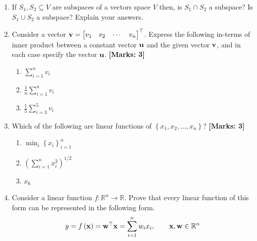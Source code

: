 \begin{enumerate}

    \item If $S_1, S_2 \subseteq V$ are subspaces of a vectors space $V$ then, is $S_1 \cap S_2$ a subspace? Is $S_1 \cup S_2$ a subspace? Explain your answers.
    
    \item Consider a vector $\mf{v} = \begin{bmatrix*}v_1 & v_2 & \cdots & v_n\end{bmatrix*}^\top$. Express the following in-terms of inner product between a constant vector $\mathbf{u}$ and the given vector $\mathbf{v}$, and in each case specify the vector $\mathbf{u}$. \textbf{[Marks: 3]}
    \begin{enumerate}
        \item $\sum_{i=1}^n v_i$
        \item $\frac{1}{n}\sum_{i=1}^n v_i$
        \item $\frac{1}{5}\sum_{i=3}^5 v_i$
    \end{enumerate} 
    
    \item Which of the following are linear functions of $\left\{x_1, x_2, \ldots,x_n\right\}$? \textbf{[Marks: 3]}
    \begin{enumerate}
        \item $\min_i \left\{x_i\right\}_{i=1}^{n}$
        \item $\left(\sum_{i=1}^n x_i^2\right)^{1/2}$
        \item $x_6$
    \end{enumerate}

    \item Consider a linear function $f: \mathbb{R}^n \rightarrow \mathbb{R}$. Prove that every linear function of this form can be represented in the following form.
    \[ y = f\left(\mathbf{x}\right) = \mathbf{w}^\top\mathbf{x} = \sum_{i=1}^{n}w_ix_i, \quad \quad \mathbf{x}, \mathbf{w} \in \mathbb{R}^n \]


\end{enumerate}
